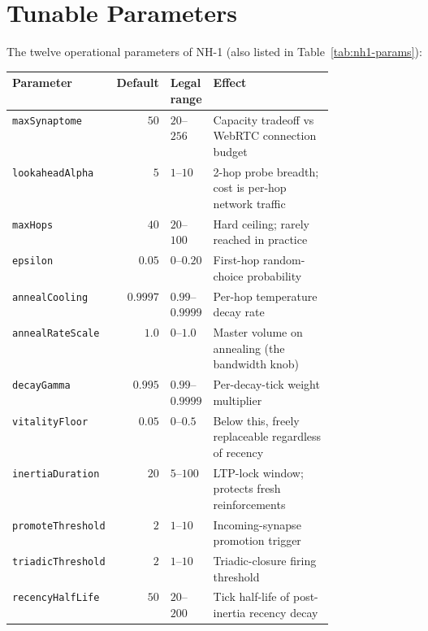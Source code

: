 \documentclass[twoside,nobib]{tufte-book}
\begin{document}
\section{Tunable Parameters}

The twelve operational parameters of NH-1 (also listed in
Table~\ref{tab:nh1-params}):

\begin{table}[h]
\centering
\small
\begin{tabular}{@{}lrlp{0.46\linewidth}@{}}
\toprule
\textbf{Parameter} & \textbf{Default} & \textbf{Legal range} & \textbf{Effect} \\
\midrule
\texttt{maxSynaptome}    & $50$    & $20$--$256$  & Capacity tradeoff vs WebRTC connection budget \\
\texttt{lookaheadAlpha}  & $5$     & $1$--$10$    & 2-hop probe breadth; cost is per-hop network traffic \\
\texttt{maxHops}         & $40$    & $20$--$100$  & Hard ceiling; rarely reached in practice \\
\texttt{epsilon}         & $0.05$  & $0$--$0.20$  & First-hop random-choice probability \\
\texttt{annealCooling}   & $0.9997$ & $0.99$--$0.9999$ & Per-hop temperature decay rate \\
\texttt{annealRateScale} & $1.0$   & $0$--$1.0$   & Master volume on annealing (the bandwidth knob) \\
\texttt{decayGamma}      & $0.995$ & $0.99$--$0.9999$ & Per-decay-tick weight multiplier \\
\texttt{vitalityFloor}   & $0.05$  & $0$--$0.5$   & Below this, freely replaceable regardless of recency \\
\texttt{inertiaDuration} & $20$    & $5$--$100$   & LTP-lock window; protects fresh reinforcements \\
\texttt{promoteThreshold} & $2$    & $1$--$10$    & Incoming-synapse promotion trigger \\
\texttt{triadicThreshold} & $2$    & $1$--$10$    & Triadic-closure firing threshold \\
\texttt{recencyHalfLife} & $50$    & $20$--$200$  & Tick half-life of post-inertia recency decay \\
\bottomrule
\end{tabular}
\end{table}
\end{document}
